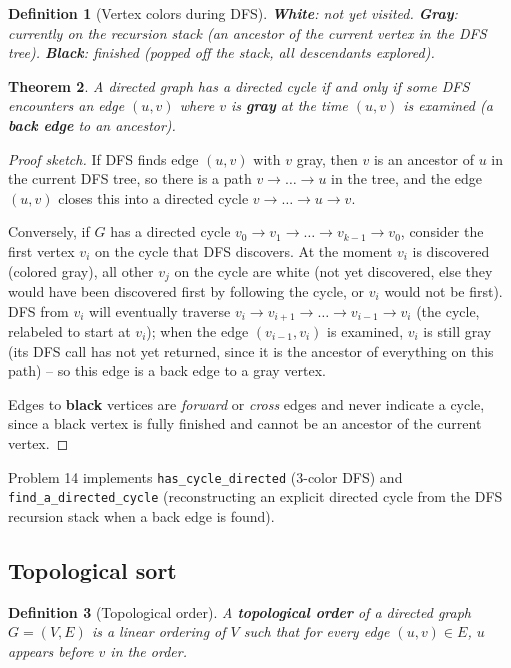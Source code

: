 \documentclass[11pt]{article}
\newtheorem{theorem}{Theorem}[section]
\newtheorem{definition}[theorem]{Definition}
\begin{document}
\begin{definition}[Vertex colors during DFS]
\textbf{White}: not yet visited. \textbf{Gray}: currently on the recursion stack (an
ancestor of the current vertex in the DFS tree). \textbf{Black}: finished (popped off
the stack, all descendants explored).
\end{definition}

\begin{theorem}
A directed graph has a directed cycle if and only if some DFS encounters an edge $(u,v)$
where $v$ is \textbf{gray} at the time $(u,v)$ is examined (a \textbf{back edge} to an
ancestor).
\end{theorem}
\begin{proof}[Proof sketch]
If DFS finds edge $(u,v)$ with $v$ gray, then $v$ is an ancestor of $u$ in the current DFS
tree, so there is a path $v \to \dots \to u$ in the tree, and the edge $(u,v)$ closes this
into a directed cycle $v \to \dots \to u \to v$.

Conversely, if $G$ has a directed cycle $v_0 \to v_1 \to \dots \to v_{k-1} \to v_0$,
consider the first vertex $v_i$ on the cycle that DFS discovers. At the moment $v_i$ is
discovered (colored gray), all other $v_j$ on the cycle are white (not yet discovered,
else they would have been discovered first by following the cycle, or $v_i$ would not be
first). DFS from $v_i$ will eventually traverse $v_i \to v_{i+1} \to \dots \to v_{i-1}
\to v_i$ (the cycle, relabeled to start at $v_i$); when the edge $(v_{i-1}, v_i)$ is
examined, $v_i$ is still gray (its DFS call has not yet returned, since it is the ancestor
of everything on this path) -- so this edge is a back edge to a gray vertex.

Edges to \textbf{black} vertices are \emph{forward} or \emph{cross} edges and never
indicate a cycle, since a black vertex is fully finished and cannot be an ancestor of the
current vertex.
\end{proof}

Problem 14 implements \texttt{has\_cycle\_directed} (3-color DFS) and
\texttt{find\_a\_directed\_cycle} (reconstructing an explicit directed cycle from the DFS
recursion stack when a back edge is found).

\subsection{Topological sort}

\begin{definition}[Topological order]
A \textbf{topological order} of a directed graph $G=(V,E)$ is a linear ordering of $V$
such that for every edge $(u,v) \in E$, $u$ appears before $v$ in the order.
\end{definition}
\end{document}
